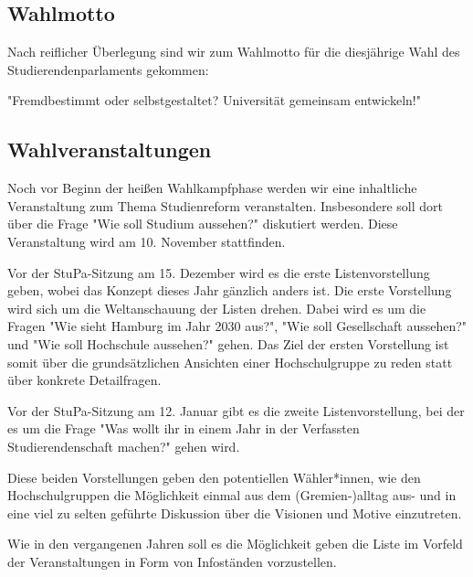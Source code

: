 \documentclass[ngerman,headheight=70pt]{scrartcl}
\begin{document}
    \subsection{Wahlmotto}

    Nach reiflicher Überlegung sind wir zum Wahlmotto für die diesjährige Wahl
    des Studierendenparlaments gekommen:

    "Fremdbestimmt oder selbstgestaltet? Universität gemeinsam entwickeln!"

    \subsection{Wahlveranstaltungen}

    Noch vor Beginn der heißen Wahlkampfphase werden wir eine inhaltliche Veranstaltung
    zum Thema Studienreform veranstalten. Insbesondere soll dort über die Frage
    "Wie soll Studium aussehen?" diskutiert werden. Diese Veranstaltung wird am
    10. November stattfinden.

    Vor der StuPa-Sitzung am 15. Dezember wird es die erste Listenvorstellung
    geben, wobei das Konzept dieses Jahr gänzlich anders ist. Die erste
    Vorstellung wird sich um die Weltanschauung der Listen drehen.
    Dabei wird es um die Fragen "Wie sieht Hamburg im Jahr 2030 aus?",
    "Wie soll Gesellschaft aussehen?" und "Wie soll Hochschule aussehen?"
    gehen. Das Ziel der ersten Vorstellung ist somit über die grundsätzlichen
    Ansichten einer Hochschulgruppe zu reden statt über konkrete Detailfragen.

    Vor der StuPa-Sitzung am 12. Januar gibt es die zweite Listenvorstellung,
    bei der es um die Frage "Was wollt ihr in einem Jahr in der Verfassten
    Studierendenschaft machen?" gehen wird.

    Diese beiden Vorstellungen geben den potentiellen Wähler*innen, wie den
    Hochschulgruppen die Möglichkeit einmal aus dem (Gremien-)alltag aus- und in
    eine viel zu selten geführte Diskussion über die Visionen und Motive einzutreten.

    Wie in den vergangenen Jahren soll es die Möglichkeit geben die Liste im
    Vorfeld der Veranstaltungen in Form von Infoständen vorzustellen.
\end{document}
